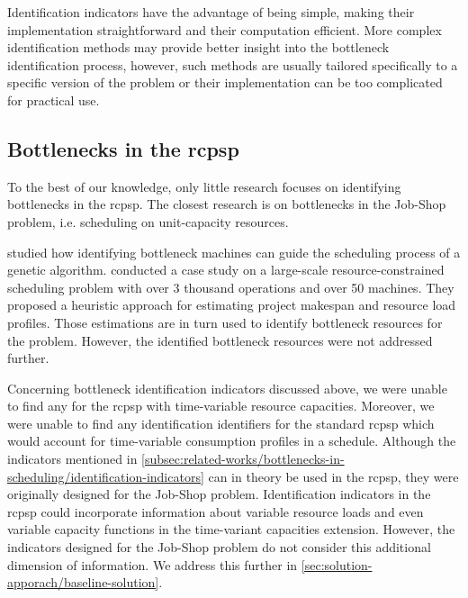 Identification indicators have the advantage of being simple,
making their implementation straightforward and their computation efficient.
More complex identification methods may provide better insight into the bottleneck identification process,
however, such methods are usually tailored specifically to a specific version of the problem
or their implementation can be too complicated for practical use.

\subsection{Bottlenecks in the \acs{rcpsp}} \label{subsec:related-works/bottlenecks-in-scheduling/bottlenecks-in-the-rcpsp}

To the best of our knowledge, only little research focuses on identifying bottlenecks in the \ac{rcpsp}.
The closest research is on bottlenecks in the Job-Shop problem,
i.e. scheduling on unit-capacity resources.

\citet{Luo2023} studied how identifying bottleneck machines can guide the scheduling
process of a genetic algorithm.
\citet{Arkhipov2017} conducted a case study on a large-scale resource-constrained scheduling problem
with over 3 thousand operations and over 50 machines.
They proposed a heuristic approach for estimating project makespan and resource load profiles.
Those estimations are in turn used to identify bottleneck resources for the problem.
However, the identified bottleneck resources were not addressed further.

Concerning bottleneck identification indicators discussed above,
we were unable to find any for the \ac{rcpsp} with time-variable resource capacities.
Moreover, we were unable to find any identification identifiers for the standard \ac{rcpsp}
which would account for time-variable consumption profiles in a schedule.
Although the indicators mentioned in \cref{subsec:related-works/bottlenecks-in-scheduling/identification-indicators}
can in theory be used in the \ac{rcpsp},
they were originally designed for the Job-Shop problem.
Identification indicators in the \ac{rcpsp} could incorporate information about
variable resource loads and even
variable capacity functions in the time-variant capacities extension.
However, the indicators designed for the Job-Shop problem do not consider
this additional dimension of information.
We address this further in \cref{sec:solution-apporach/baseline-solution}.

